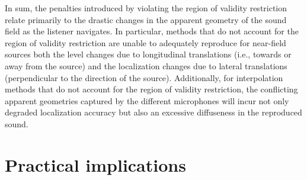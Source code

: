 In sum, the penalties introduced by violating the region of validity restriction relate primarily to the drastic changes in the apparent geometry of the sound field as the listener navigates.
In particular, methods that do not account for the region of validity restriction are unable to adequately reproduce for near-field sources both the level changes due to longitudinal translations (i.e., towards or away from the source) and the localization changes due to lateral translations (perpendicular to the direction of the source).
Additionally, for interpolation methods that do not account for the region of validity restriction, the conflicting apparent geometries captured by the different microphones will incur not only degraded localization accuracy but also an excessive diffuseness in the reproduced sound.

\section{Practical implications}

